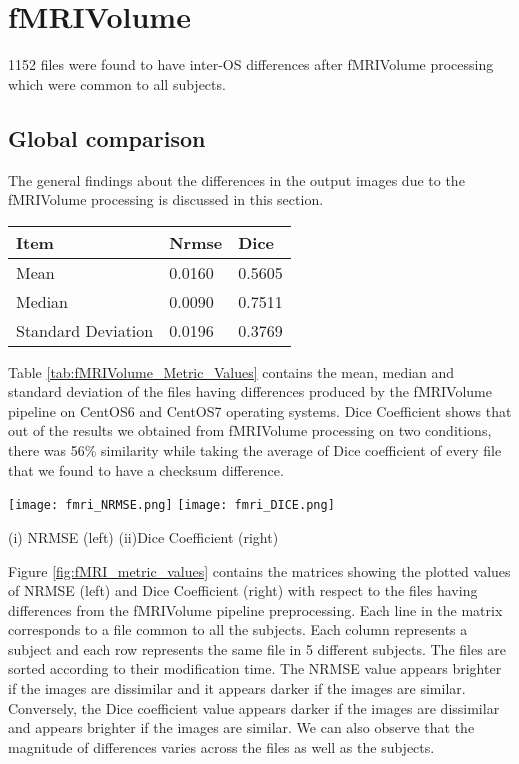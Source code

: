 \section{fMRIVolume}\label{sec:fMRI}
1152 files were found to have inter-OS differences after fMRIVolume processing which were common to all subjects.
\subsection{Global comparison}
The general findings about the differences in the output images due to the fMRIVolume processing is discussed in this section.

\begin{center}
\begin{tabular}{|l|l|l|}
\hline
\textbf{Item}      & \textbf{Nrmse}  & \textbf{Dice} \\ \hline
Mean               & 0.0160    & 0.5605   \\ \hline
Median             & 0.0090     & 0.7511   \\ \hline
Standard Deviation & 0.0196     & 0.3769   \\ \hline
\end{tabular}
\label{tab:fMRIVolume_Metric_Values}
\end{center}

Table \ref{tab:fMRIVolume_Metric_Values} contains the mean, median and standard deviation of the files having differences produced by the fMRIVolume pipeline on CentOS6 and CentOS7 operating systems. Dice Coefficient shows that out of the results we obtained from fMRIVolume processing on two conditions, there was 56\% similarity while taking the average of Dice coefficient of every file that we found to have a checksum difference.

\begin{center}
\texttt{[image: fmri\_NRMSE.png]}%
\texttt{[image: fmri\_DICE.png]}
\caption*{(i) NRMSE (left) (ii)Dice Coefficient (right)}
\label{fig:fMRI_metric_values}
\end{center}

Figure \ref{fig:fMRI_metric_values} contains the matrices showing the plotted values of NRMSE (left) and Dice Coefficient (right) with respect to the files having differences from the fMRIVolume pipeline preprocessing. Each line in the matrix corresponds to a file common to all the subjects. Each column represents a subject and each row represents the same file in 5 different subjects. The files are sorted according to their modification time. The NRMSE value appears brighter if the images are dissimilar and it appears darker if the images are similar. Conversely, the Dice coefficient value appears darker if the images are dissimilar and appears brighter if the images are similar. We can also observe that the magnitude of differences varies across the files as well as the subjects.

